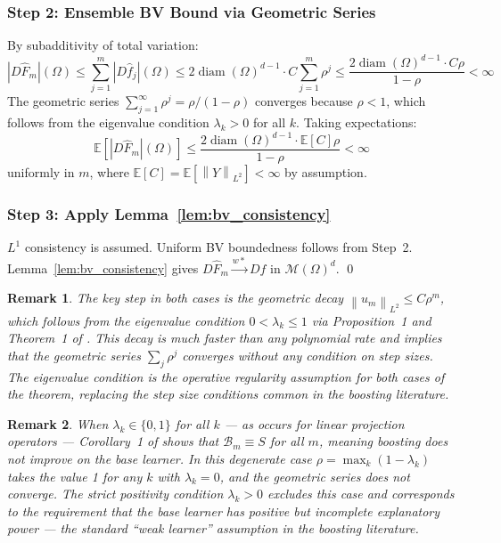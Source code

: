 \documentclass[12pt]{article}
\newtheorem{remark}{Remark}
\newcommand{\norm}[1]{\left\| #1 \right\|}
\newcommand{\cM}{\mathcal{M}(\Omega)^d}
\begin{document}
	\subsubsection*{Step 2: Ensemble BV Bound via Geometric Series}
	
	By subadditivity of total variation:
	\begin{equation}
		|D\hat{F}_m|(\Omega)
		\leq \sum_{j=1}^m |D\hat{f}_j|(\Omega)
		\leq 2\operatorname{diam}(\Omega)^{d-1} \cdot C \sum_{j=1}^m \rho^j
		\leq \frac{2\operatorname{diam}(\Omega)^{d-1} \cdot C\rho}{1-\rho}
		< \infty
	\end{equation}
	The geometric series $\sum_{j=1}^\infty \rho^j = \rho/(1-\rho)$ converges because
	$\rho < 1$, which follows from the eigenvalue condition $\lambda_k > 0$ for all $k$.
	Taking expectations:
	\begin{equation}
		\mathbb{E}[|D\hat{F}_m|(\Omega)]
		\leq \frac{2\operatorname{diam}(\Omega)^{d-1} \cdot \mathbb{E}[C]\rho}{1-\rho}
		< \infty
	\end{equation}
	uniformly in $m$, where $\mathbb{E}[C] = \mathbb{E}[\norm{Y}_{L^2}] < \infty$
	by assumption.
	
	\subsubsection*{Step 3: Apply Lemma~\ref{lem:bv_consistency}}
	
	$L^1$ consistency is assumed. Uniform BV boundedness follows from Step~2.
	Lemma~\ref{lem:bv_consistency} gives $D\hat{F}_m \xrightarrow{w*} Df$ in $\cM$.
	\qed
	
	\begin{remark}
		The key step in both cases is the geometric decay $\norm{u_m}_{L^2} \leq C\rho^m$,
		which follows from the eigenvalue condition $0 < \lambda_k \leq 1$ via Proposition~1
		and Theorem~1 of \citet{buhlmann2003boosting}. This decay is much faster than any
		polynomial rate and implies that the geometric series $\sum_j \rho^j$ converges
		without any condition on step sizes. The eigenvalue condition is the operative
		regularity assumption for both cases of the theorem, replacing the step size
		conditions common in the boosting literature.
	\end{remark}
	
	\begin{remark}
		When $\lambda_k \in \{0,1\}$ for all $k$ --- as occurs for linear projection
		operators --- Corollary~1 of \citet{buhlmann2003boosting} shows that
		$\mathcal{B}_m \equiv S$ for all $m$, meaning boosting does not improve on the
		base learner. In this degenerate case $\rho = \max_k(1-\lambda_k)$ takes the value
		1 for any $k$ with $\lambda_k = 0$, and the geometric series does not converge.
		The strict positivity condition $\lambda_k > 0$ excludes this case and corresponds
		to the requirement that the base learner has positive but incomplete explanatory
		power --- the standard ``weak learner'' assumption in the boosting literature.
	\end{remark}
	
\end{document}
